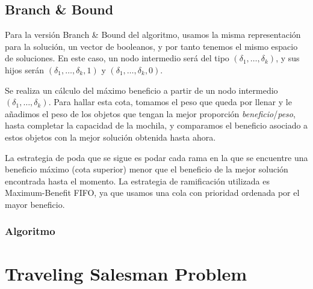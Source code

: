 \documentclass[a4paper, 11pt]{article} %
\begin{document}
	  \small
	    \texttt{}
	  \normalsize
    
    
	\subsection{Branch \& Bound}
	  Para la versión Branch \& Bound del algoritmo, usamos la misma representación para la solución, 
	  un vector de booleanos, y por tanto tenemos el mismo espacio de soluciones. En este caso, un nodo 
	  intermedio será del tipo $(\delta_1, \dots, \delta_k)$, y sus hijos serán $(\delta_1, \dots, \delta_k, 1)$ 
	  y $(\delta_1, \dots, \delta_k, 0)$.
	  
	  Se realiza un cálculo del máximo beneficio a partir de un nodo intermedio $(\delta_1, \dots, \delta_k)$. 
	  Para hallar esta cota, tomamos el peso que queda por llenar y le añadimos el peso de los objetos que tengan
	  la mejor proporción \textit{beneficio}/\textit{peso}, hasta completar la capacidad de la mochila, y comparamos
	  el beneficio asociado a estos objetos con la mejor solución obtenida hasta ahora.
	  
	  La estrategia de poda que se sigue es podar cada rama en la que se encuentre una beneficio máximo (cota superior) 
	  menor que el beneficio de la mejor solución encontrada hasta el momento. La estrategia de ramificación utilizada es 
	  Maximum-Benefit FIFO, ya que usamos una cola con prioridad ordenada por el mayor beneficio.
      
	  \subsubsection{Algoritmo}
	    
	    \small
	    \texttt{}
	    \normalsize
      
    
    
    \section{Traveling Salesman Problem}
\end{document}
